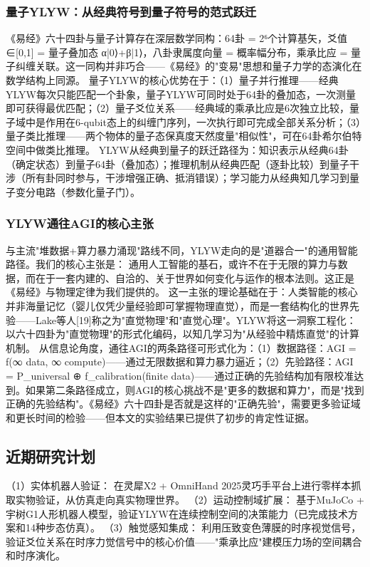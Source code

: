 \documentclass[12pt,a4paper]{article}
\begin{document}
\subsubsection{量子YLYW：从经典符号到量子符号的范式跃迁}
《易经》六十四卦与量子计算存在深层数学同构：64卦 = 2⁶个计算基矢，爻值∈[0,1] = 量子叠加态 α|0⟩+β|1⟩，八卦隶属度向量 = 概率幅分布，乘承比应 = 量子纠缠关联。这一同构并非巧合——《易经》的"变易"思想和量子力学的态演化在数学结构上同源。
量子YLYW的核心优势在于：（1）量子并行推理——经典YLYW每次只能匹配一个卦象，量子YLYW可同时处于64卦的叠加态，一次测量即可获得最优匹配；（2）量子爻位关系——经典域的乘承比应是6次独立比较，量子域中是作用在6-qubit态上的纠缠门序列，一次执行即可完成全部关系分析；（3）量子类比推理——两个物体的量子态保真度天然度量"相似性"，可在64卦希尔伯特空间中做类比推理。
YLYW从经典到量子的跃迁路径为：知识表示从经典64卦（确定状态）到量子64卦（叠加态）；推理机制从经典匹配（逐卦比较）到量子干涉（所有卦同时参与，干涉增强正确、抵消错误）；学习能力从经典知几学习到量子变分电路（参数化量子门）。

\subsubsection{YLYW通往AGI的核心主张}
与主流"堆数据+算力暴力涌现"路线不同，YLYW走向的是"道器合一"的通用智能路径。我们的核心主张是：
通用人工智能的基石，或许不在于无限的算力与数据，而在于一套内建的、自洽的、关于世界如何变化与运作的根本法则。这正是《易经》与物理定律为我们提供的。
这一主张的理论基础在于：人类智能的核心并非海量记忆（婴儿仅凭少量经验即可掌握物理直觉），而是一套结构化的世界先验——Lake等人[19]称之为"直觉物理"和"直觉心理"。YLYW将这一洞察工程化：以六十四卦为"直觉物理"的形式化编码，以知几学习为"从经验中精炼直觉"的计算机制。
从信息论角度，通往AGI的两条路径可形式化为：（1）数据路径：AGI = f(∞ data, ∞ compute)——通过无限数据和算力暴力逼近；（2）先验路径：AGI = P\_universal ⊕ f\_calibration(finite data)——通过正确的先验结构加有限校准达到。如果第二条路径成立，则AGI的核心挑战不是"更多的数据和算力"，而是"找到正确的先验结构"。《易经》六十四卦是否就是这样的"正确先验"，需要更多验证域和更长时间的检验——但本文的实验结果已提供了初步的肯定性证据。

\subsection{近期研究计划}
（1）实体机器人验证： 在灵犀X2 + OmniHand 2025灵巧手平台上进行零样本抓取实物验证，从仿真走向真实物理世界。
（2）运动控制域扩展： 基于MuJoCo + 宇树G1人形机器人模型，验证YLYW在连续控制空间的决策能力（已完成技术方案和14种步态仿真）。
（3）触觉感知集成： 利用压致变色薄膜的时序视觉信号，验证爻位关系在时序力觉信号中的核心价值——"乘承比应"建模压力场的空间耦合和时序演化。
\end{document}
